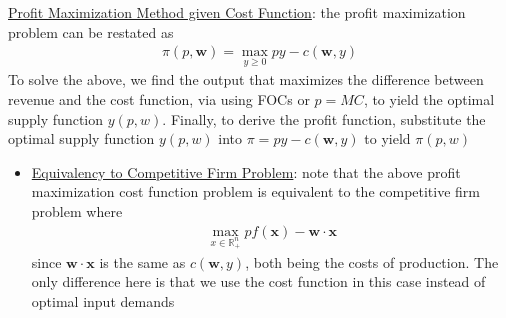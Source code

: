 \documentclass{article}
\begin{document}
  \par
  \underline{Profit Maximization Method given Cost Function}: the profit maximization problem can be restated as
  \begin{gather*}
    \pi (p,\mathbf{w}) = \max_{y \geq 0} py - c(\mathbf{w}, y)
  \end{gather*}
  To solve the above, we find the output that maximizes the difference between revenue and the cost function, via using FOCs or $p = MC$, to yield the optimal supply function $y(p,w)$. Finally, to derive the profit function, substitute the optimal supply function $y(p,w)$ into $\pi = py - c(\mathbf{w}, y)$ to yield $\pi(p,w)$
  \begin{itemize}
    \item  \underline{Equivalency to Competitive Firm Problem}: note that the above profit maximization cost function problem is equivalent to the competitive firm problem where
    \begin{gather*}
      \max_{x \in \mathbb{R}_{+}^{n}} pf(\mathbf{x}) - \mathbf{w} \cdot \mathbf{x}
    \end{gather*}
    since $\mathbf{w} \cdot \mathbf{x}$ is the same as $c(\mathbf{w}, y)$, both being the costs of production. The only difference here is that we use the cost function in this case instead of optimal input demands
  \end{itemize}
  \par
\vspace{6mm}
\end{document}
